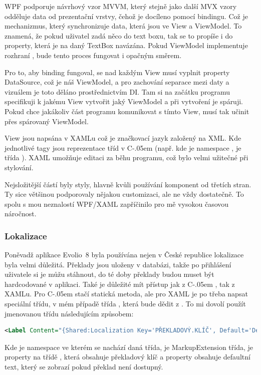 \documentclass[czech,bachelor,dept460,male,csharp]{diploma}
\newcommand{\EvolioEight}{Evolio~8}
\newcommand{\Csharp}{%
  {\settoheight{\dimen0}{C}C\kern-.05em \resizebox{!}{\dimen0}{\raisebox{\depth}{\#}}}}
\begin{document}
			WPF podporuje návrhový vzor MVVM, který stejně jako další MVX vzory odděluje data od prezentační vrstvy, čehož je docíleno pomocí bindingu. Což je mechanizmus, který synchronizuje data, která jsou ve View a ViewModel. To znamená, že pokud uživatel zadá něco do text boxu, tak se to propíše i do property, která je na daný TextBox navázána. Pokud ViewModel implementuje rozhraní , bude tento proces fungovat i opačným směrem.
			
			Pro to, aby binding fungoval, se nad každým View musí vyplnit property DataSource, což je náš ViewModel, a pro zachování separace mezi daty a vizuálem je toto děláno prostřednictvím DI. Tam si na začátku programu specifikuji k jakému View vytvořit jaký ViewModel a při vytvoření je spáruji. Pokud chce jakákoliv část programu komunikovat s tímto View, musí tak učinit přes spárovaný ViewModel.
			
			View jsou napsána v XAMLu což je značkovací jazyk založený na XML. Kde jednotlivé tagy jsou reprezentace tříd v {\Csharp} (např.  kde  je namespace , je třída  ). XAML umožňuje editaci za běhu programu, což bylo velmi užitečné při stylování. 
			
			Nejsložitější částí byly styly, hlavně kvůli používání komponent od třetích stran. Ty sice většinou podporovaly nějakou customizaci, ale ne vždy dostatečně. To spolu s mou neznalostí WPF/XAML zapříčinilo pro mě vysokou časovou náročnost.
		\subsubsection{Lokalizace}
			Poněvadž aplikace {\EvolioEight} byla používána nejen v České republice lokalizace byla velmi důležitá. Překlady jsou uloženy v databázi, takže po přihlášení uživatele si je můžu stáhnout, do té doby překlady budou muset být hardcodované v aplikaci. Také je důležité mít přístup jak z {\Csharp}, tak z XAMLu. Pro {\Csharp} stačí statická metoda, ale pro XAML je po třeba napsat speciální třídu, v mém případě třída , která bude dědit z . To mi dovolí použít jmenovanou třídu následujícím způsobem:
			\begin{lstlisting}[language=XML,caption={MarkupExtension příkad},label=MarkupExtension]
<Label Content="{Shared:Localization Key='PŘEKLADOVÝ.KLÍČ', Default='Defaultní text'}"/>
			\end{lstlisting}
			 Kde  je namespace ve kterém se nachází daná třída,  je MarkupExtension třída,  je property na třídě , která obsahuje překladový klíč a property  obsahuje defaultní text, který se zobrazí pokud překlad není dostupný.
\end{document}

